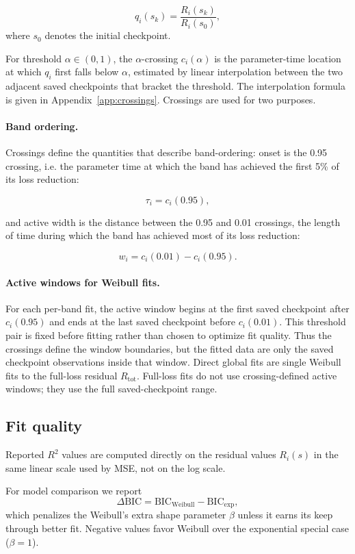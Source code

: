 \documentclass{article}
\begin{document}
\[
q_i(s_k)=\frac{R_i(s_k)}{R_i(s_0)},
\]
where $s_0$ denotes the initial checkpoint.

For threshold $\alpha\in(0,1)$, the \(\alpha\)-crossing
$c_i(\alpha)$ is the parameter-time location at which $q_i$ first
falls below \(\alpha\), estimated by linear interpolation between the two
adjacent saved checkpoints that bracket the threshold. The interpolation
formula is given in Appendix~\ref{app:crossings}. Crossings are used for two purposes. 

\paragraph{Band ordering.} Crossings define the quantities that describe
band-ordering: onset is the 0.95 crossing, i.e. the parameter time at which the
band has achieved the first 5\% of its loss reduction:

\[
\tau_i=c_i(0.95),
\]

and active width is the distance between the 0.95 and 0.01 crossings, the length
of time during which the band has achieved most of its loss reduction:

\[
w_i=c_i(0.01)-c_i(0.95).
\]

\paragraph{Active windows for Weibull fits.}
For each per-band fit, the active window begins at the first saved
checkpoint after $c_i(0.95)$ and ends at the last saved checkpoint
before $c_i(0.01)$. This threshold pair is fixed before fitting rather
than chosen to optimize fit quality. Thus the crossings define the window
boundaries, but the fitted data are only the saved checkpoint observations
inside that window. Direct global fits are single Weibull fits to the
full-loss residual $R_{\mathrm{tot}}$. Full-loss fits do not use crossing-defined
active windows; they use the full saved-checkpoint range.

\subsection{Fit quality}\label{fit-diagnostics-and-model-comparison}

Reported $R^2$ values are computed directly on the residual values $R_i(s)$ in the
same linear scale used by MSE, not on the log scale.

For model comparison we report
\[
\Delta\mathrm{BIC}
=
\mathrm{BIC}_{\mathrm{Weibull}}
-
\mathrm{BIC}_{\mathrm{exp}},
\]
which penalizes the Weibull's extra shape parameter $\beta$ unless it
earns its keep through better fit. Negative values favor Weibull over
the exponential special case ($\beta=1$).
\end{document}
